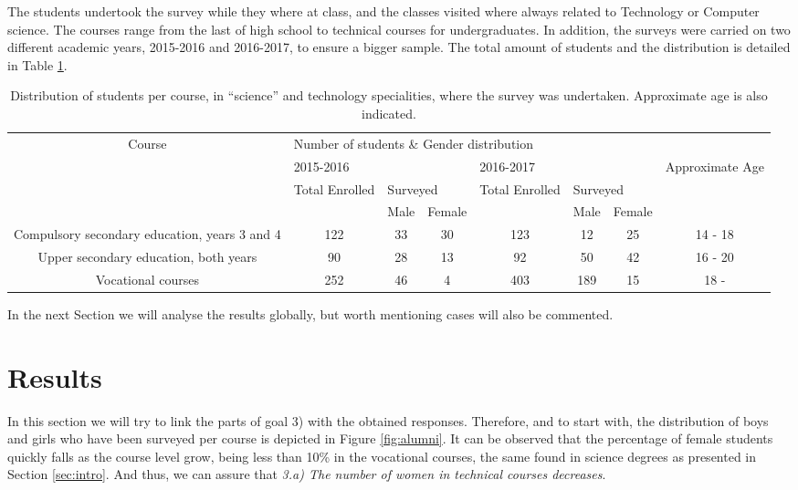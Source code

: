 \documentclass[journal,transmag]{IEEEtran}
\begin{document}
The students undertook the survey while they where at class, and the classes visited where always related to Technology or Computer science. The courses range from the last of high school to technical courses for undergraduates. In addition, the surveys were carried on two different academic years, 2015-2016 and 2016-2017, to ensure a bigger sample. The total amount of students and the distribution is detailed in Table \ref{tab:muestra}.

\begin{table}
  \caption[Students who undertook the surveys]{Distribution of students per course, in ``science'' and technology specialities, where the survey was undertaken. Approximate age is also indicated.}
  \label{tab:muestra}

  \begin{center}
    \begin{tabular}{|c|c|c|c|c|c|c|c|}
    	\hline
    	\multirow{4}{*}{Course} & \multicolumn{7}{l|}{Number of students \& Gender distribution} \\ \cline{2-8}
    	& \multicolumn{3}{l|}{2015-2016} & \multicolumn{3}{l|}{2016-2017} & \multirow{3}{*}{Approximate Age} \\ \cline{2-7}
    	& \multirow{2}{*}{Total Enrolled} & \multicolumn{2}{l|}{Surveyed} & \multirow{2}{*}{Total Enrolled} & \multicolumn{2}{l|}{Surveyed} & \\ \cline{3-4} \cline{6-7}
    	& & Male & Female & & Male & Female & \\ \hline
    	Compulsory secondary education, years 3 and 4 & 122 & 33 & 30 & 123 & 12  & 25 & 14 - 18 \\ \hline
    	Upper secondary education, both years         & 90  & 28 & 13 & 92  & 50  & 42 & 16 - 20 \\ \hline
    	Vocational courses                            & 252 & 46 & 4  & 403 & 189 & 15 & 18 -    \\ \hline
    \end{tabular}
  \end{center}
\end{table}

In the next Section we will analyse the results globally, but worth mentioning cases will also be commented.

\section{Results}
\label{sec:results}

In this section we will try to link the parts of goal 3) with the obtained responses. Therefore, and to start with, the distribution of boys and girls who have been surveyed per course is depicted in Figure \ref{fig:alumni}. It can be observed that the percentage of female students quickly falls as the course level grow, being less than 10\% in the vocational courses, the same found in science degrees as presented in Section \ref{sec:intro}. And thus, we can assure that \textit{3.a) The number of women in technical courses decreases}.
\end{document}
